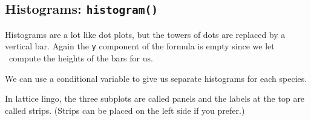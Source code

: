 \subsection{Histograms: \texttt{histogram()}}

Histograms are a lot like dot plots, but the towers of dots are replaced by a vertical bar.
Again the \verb!y! component of the formula is empty since we let \R\
compute the heights of the bars for us.
\begin{knitrout}
\end{knitrout}

We can use a conditional variable to give us separate histograms for each species.

\begin{knitrout}
\end{knitrout}



In lattice lingo, the three subplots are called panels and the 
labels at the top are called strips.  (Strips can be placed on the left side if you 
prefer.)


